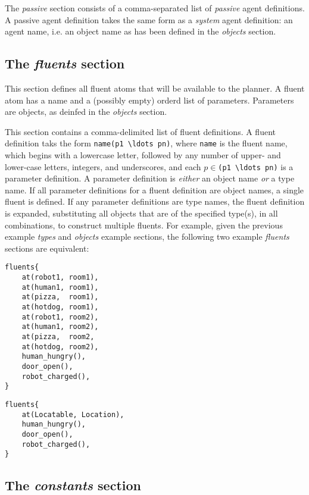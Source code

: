 \documentclass{article}
\begin{document}
The \emph{passive} section consists of a comma-separated list of \emph{passive} agent
definitions. A passive agent definition takes the same form as a \emph{system}
agent definition: an agent name, i.e. an object name as has been defined in the
\emph{objects} section.


\subsection{The \emph{fluents} section}

This section defines all fluent atoms that will be available to the planner. A
fluent atom has a name and a (possibly empty) orderd list of parameters. Parameters are
objects, as deinfed in the \emph{objects} section.

This section contains a comma-delimited list of fluent definitions. A fluent
definition taks the form \verb|name(p1 \ldots pn)|, where \verb|name| is the
fluent name, which begins with a lowercase letter, followed by any number of
upper- and lower-case letters, integers, and underscores, and each
$p\in$\verb|(p1 \ldots pn)| is a parameter definition. A parameter definition is
\emph{either} an object name \emph{or} a type name. If all parameter definitions
for a fluent definition are object names, a single fluent is defined. If any
parameter definitions are type names, the fluent definition is expanded,
substituting all objects that are of the specified type(s), in all combinations, to
construct multiple fluents. For example, given the previous example \emph{types}
and \emph{objects} example sections, the following two example
\emph{fluents} sections are equivalent:

\begin{verbatim}
fluents{
    at(robot1, room1),
    at(human1, room1),
    at(pizza,  room1),
    at(hotdog, room1),
    at(robot1, room2),
    at(human1, room2),
    at(pizza,  room2,
    at(hotdog, room2),
    human_hungry(),
    door_open(),
    robot_charged(),
}
\end{verbatim}

\begin{verbatim}
fluents{
    at(Locatable, Location),
    human_hungry(),
    door_open(),
    robot_charged(),
}
\end{verbatim}



\subsection{The \emph{constants} section}
\end{document}
